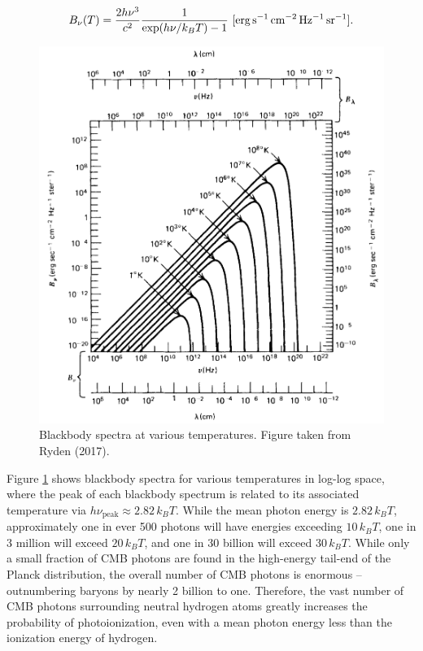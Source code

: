 \documentclass[a4paper,11pt]{article}
\begin{document}
\begin{align}\label{eq:Planck}
    B_\nu(T) = \frac{2h\nu^3}{c^2} \frac{1}{\exp(h\nu/k_BT) - 1} ~ [{\rm erg\,s^{-1}\,cm^{-2}\,Hz^{-1}\,sr^{-1}}].
\end{align} 

\begin{figure}[h]
    \includegraphics[width=14cm]{figures/blackbody.png}
    \centering
    \caption{Blackbody spectra at various temperatures. Figure taken from Ryden (2017).}
    \label{fig:blackbody}
\end{figure}

{\noindent}Figure \ref{fig:blackbody} shows blackbody spectra for various temperatures in log-log space, where the peak of each blackbody spectrum is related to its associated temperature via $h\nu_\mathrm{peak} \approx 2.82\,k_BT$. While the mean photon energy is $2.82\,k_BT$, approximately one in ever 500 photons will have energies exceeding $10\,k_BT$, one in 3 million will exceed $20\,k_BT$, and one in 30 billion will exceed $30\,k_BT$. While only a small fraction of CMB photons are found in the high-energy tail-end of the Planck distribution, the overall number of CMB photons is enormous -- outnumbering baryons by nearly 2 billion to one. Therefore, the vast number of CMB photons surrounding neutral hydrogen atoms greatly increases the probability of photoionization, even with a mean photon energy less than the ionization energy of hydrogen.
\end{document}
